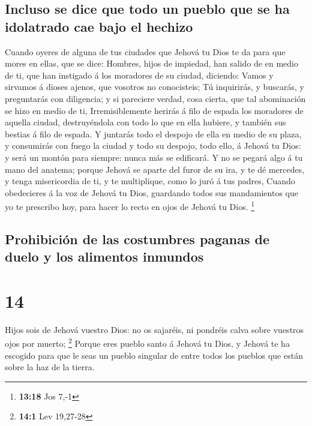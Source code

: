 \hypertarget{incluso-se-dice-que-todo-un-pueblo-que-se-ha-idolatrado-cae-bajo-el-hechizo}{%
\subsection{Incluso se dice que todo un pueblo que se ha idolatrado cae
bajo el
hechizo}\label{incluso-se-dice-que-todo-un-pueblo-que-se-ha-idolatrado-cae-bajo-el-hechizo}}

 Cuando oyeres de alguna de tus ciudades que Jehová tu Dios
te da para que mores en ellas, que se dice:  Hombres, hijos
de impiedad, han salido de en medio de ti, que han instigado á los
moradores de su ciudad, diciendo: Vamos y sirvamos á dioses ajenos, que
vosotros no conocisteis;  Tú inquirirás, y buscarás, y
preguntarás con diligencia; y si pareciere verdad, cosa cierta, que tal
abominación se hizo en medio de ti,  Irremisiblemente
herirás á filo de espada los moradores de aquella ciudad, destruyéndola
con todo lo que en ella hubiere, y también sus bestias á filo de espada.
 Y juntarás todo el despojo de ella en medio de su plaza, y
consumirás con fuego la ciudad y todo su despojo, todo ello, á Jehová tu
Dios: y será un montón para siempre: nunca más se edificará.
 Y no se pegará algo á tu mano del anatema; porque Jehová
se aparte del furor de su ira, y te dé mercedes, y tenga misericordia de
ti, y te multiplique, como lo juró á tus padres,  Cuando
obedecieres á la voz de Jehová tu Dios, guardando todos sus mandamientos
que yo te prescribo hoy, para hacer lo recto en ojos de Jehová tu Dios.
\footnote{\textbf{13:18} Jos 7,-1}

\hypertarget{prohibiciuxf3n-de-las-costumbres-paganas-de-duelo-y-los-alimentos-inmundos}{%
\subsection{Prohibición de las costumbres paganas de duelo y los
alimentos
inmundos}\label{prohibiciuxf3n-de-las-costumbres-paganas-de-duelo-y-los-alimentos-inmundos}}

\hypertarget{section-13}{%
\section{14}\label{section-13}}

 Hijos sois de Jehová vuestro Dios: no os sajaréis, ni
pondréis calva sobre vuestros ojos por muerto; \footnote{\textbf{14:1}
  Lev 19,27-28}  Porque eres pueblo santo á Jehová tu Dios,
y Jehová te ha escogido para que le seas un pueblo singular de entre
todos los pueblos que están sobre la haz de la tierra.

